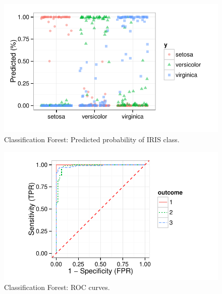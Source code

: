 \documentclass[nojss,letterpaper]{jss}\usepackage[]{graphicx}\usepackage[]{color}
\makeatletter
\def\maxwidth{ %
  \ifdim\Gin@nat@width>\linewidth
    \linewidth
  \else
    \Gin@nat@width
  \fi
}
\newenvironment{knitrout}{}{} %
\makeatother
\begin{document}
\begin{knitrout}\footnotesize
{}\color{fgcolor}\begin{figure}[!htpb]

{\centering \includegraphics[width=\maxwidth]{figure/vig-iris-rf-pred-1} 

}

\caption[Classification Forest]{Classification Forest: Predicted probability of IRIS class.\label{fig:iris-rf-pred}}
\end{figure}


\end{knitrout}


\begin{knitrout}\footnotesize
{}\color{fgcolor}\begin{figure}[!htpb]

{\centering \includegraphics[width=\maxwidth]{figure/vig-iris-rf-roc-1} 

}

\caption[Classification Forest]{Classification Forest: ROC curves.\label{fig:iris-rf-roc}}
\end{figure}


\end{knitrout}
\end{document}
